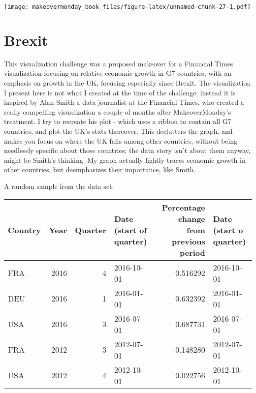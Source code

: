 \documentclass[]{book}
\theoremstyle{definition}
\theoremstyle{definition}
\theoremstyle{definition}
\theoremstyle{remark}
\begin{document}
\texttt{[image: makeovermonday\_book\_files/figure-latex/unnamed-chunk-27-1.pdf]}

\chapter{Brexit}\label{brexit}

This visualization challenge was a proposed makeover for a Financial
Times visualization focusing on relative economic growth in G7
countries, with an emphasis on growth in the UK, focusing especially
since Brexit. The visualization I present here is not what I created at
the time of the challenge; instead it is inspired by Alan Smith a data
journalist at the Financial Times, who created a really compelling
visualization a couple of months after MakeoverMonday's treatment. I try
to recreate his plot - which uses a ribbon to contain all G7 countries,
and plot the UK's stats thereover. This declutters the graph, and makes
you focus on where the UK falls among other countries, without being
needlessly specific about those countries; the data story isn't about
them anyway, might be Smith's thinking. My graph actually lightly traces
economic growth in other countries, but deemphasizes their importance,
like Smith.

A random sample from the data set:

\begin{tabular}{l|r|r|l|r|l}
\hline
Country & Year & Quarter & Date (start of quarter) & Percentage change from previous period & Date (start o quarter)\\
\hline
FRA & 2016 & 4 & 2016-10-01 & 0.516292 & 2016-10-01\\
\hline
DEU & 2016 & 1 & 2016-01-01 & 0.632392 & 2016-01-01\\
\hline
USA & 2016 & 3 & 2016-07-01 & 0.687731 & 2016-07-01\\
\hline
FRA & 2012 & 3 & 2012-07-01 & 0.148280 & 2012-07-01\\
\hline
USA & 2012 & 4 & 2012-10-01 & 0.022756 & 2012-10-01\\
\hline
\end{tabular}
\end{document}
